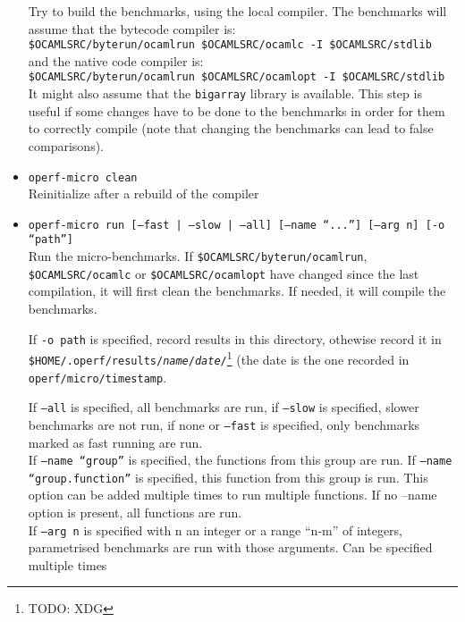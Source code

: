 \documentclass[11pt,a4paper]{article}
\begin{document}
\begin{itemize}
\begin{itemize}
  \end{itemize}
  Try to build the benchmarks, using the local compiler. The benchmarks will
  assume that the bytecode compiler is:\\
  {\tt \$OCAMLSRC/byterun/ocamlrun \$OCAMLSRC/ocamlc -I \$OCAMLSRC/stdlib}\\
  and the native code compiler is:\\
  {\tt \$OCAMLSRC/byterun/ocamlrun \$OCAMLSRC/ocamlopt -I \$OCAMLSRC/stdlib}\\
  It might also assume that the {\tt bigarray} library is available.
  This step is useful if some changes have to be done to the benchmarks in
  order for them to correctly compile (note that changing the benchmarks
  can lead to false comparisons).
\item {\tt operf-micro clean}\\
  Reinitialize after a rebuild of the compiler
\item {\tt operf-micro run [--fast | --slow | --all] [--name ``...'']
  [--arg n] [-o ``path'']}\\
  Run the micro-benchmarks. If {\tt \$OCAMLSRC/byterun/ocamlrun},
  {\tt \$OCAMLSRC/ocamlc} or {\tt \$OCAMLSRC/ocamlopt} have changed since the
  last compilation, it will first clean the benchmarks. If needed, it will
  compile the benchmarks.

  If {\tt -o path} is specified, record results in this directory,
  othewise record it in {\tt
    \$HOME/.operf/results/{\em name}/{\em date}/}\footnote{TODO: XDG}
  (the date is the one recorded in {\tt operf/micro/timestamp}.

  If {\tt --all} is specified, all benchmarks are run, if {\tt --slow}
  is specified, slower benchmarks are not run, if none or
  {\tt --fast} is specified, only benchmarks marked as fast
  running are run. \\
  If {\tt --name ``group''} is specified, the functions from this
  group are run. If {\tt --name ``group.function''} is specified, this
  function from this group is run. This option can be added multiple
  times to run multiple functions. If no --name option is present, all
  functions are run. \\
  If {\tt --arg n} is specified with n an integer or a range ``n-m'' of
  integers, parametrised benchmarks are run with those arguments. Can
  be specified multiple times


\end{itemize}
\end{document}
